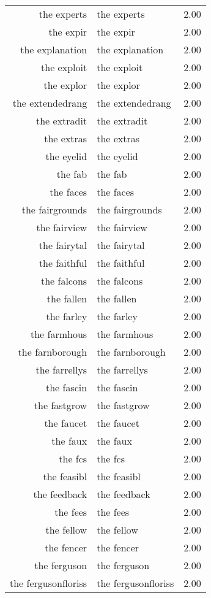 \begin{table}[ht]
\begin{tabular}{rlr}
  the experts & the experts & 2.00 \\ 
  the expir & the expir & 2.00 \\ 
  the explanation & the explanation & 2.00 \\ 
  the exploit & the exploit & 2.00 \\ 
  the explor & the explor & 2.00 \\ 
  the extendedrang & the extendedrang & 2.00 \\ 
  the extradit & the extradit & 2.00 \\ 
  the extras & the extras & 2.00 \\ 
  the eyelid & the eyelid & 2.00 \\ 
  the fab & the fab & 2.00 \\ 
  the faces & the faces & 2.00 \\ 
  the fairgrounds & the fairgrounds & 2.00 \\ 
  the fairview & the fairview & 2.00 \\ 
  the fairytal & the fairytal & 2.00 \\ 
  the faithful & the faithful & 2.00 \\ 
  the falcons & the falcons & 2.00 \\ 
  the fallen & the fallen & 2.00 \\ 
  the farley & the farley & 2.00 \\ 
  the farmhous & the farmhous & 2.00 \\ 
  the farnborough & the farnborough & 2.00 \\ 
  the farrellys & the farrellys & 2.00 \\ 
  the fascin & the fascin & 2.00 \\ 
  the fastgrow & the fastgrow & 2.00 \\ 
  the faucet & the faucet & 2.00 \\ 
  the faux & the faux & 2.00 \\ 
  the fcs & the fcs & 2.00 \\ 
  the feasibl & the feasibl & 2.00 \\ 
  the feedback & the feedback & 2.00 \\ 
  the fees & the fees & 2.00 \\ 
  the fellow & the fellow & 2.00 \\ 
  the fencer & the fencer & 2.00 \\ 
  the ferguson & the ferguson & 2.00 \\ 
  the fergusonfloriss & the fergusonfloriss & 2.00 \\ 

\end{tabular}
\end{table}

